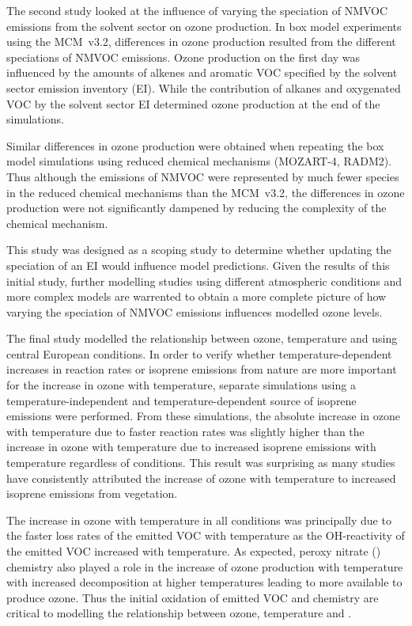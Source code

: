 The second study looked at the influence of varying the speciation of NMVOC emissions from the solvent sector on ozone production.
In box model experiments using the MCM~v3.2, differences in ozone production resulted from the different speciations of NMVOC emissions.
Ozone production on the first day was influenced by the amounts of alkenes and aromatic VOC specified by the solvent sector emission inventory (EI).
While the contribution of alkanes and oxygenated VOC by the solvent sector EI determined ozone production at the end of the simulations.

Similar differences in ozone production were obtained when repeating the box model simulations using reduced chemical mechanisms (MOZART-4, RADM2).
Thus although the emissions of NMVOC were represented by much fewer species in the reduced chemical mechanisms than the MCM~v3.2, the differences in ozone production were not significantly dampened by reducing the complexity of the chemical mechanism.

This study was designed as a scoping study to determine whether updating the speciation of an EI would influence model predictions.
Given the results of this initial study, further modelling studies using different atmospheric conditions and more complex models are warrented to obtain a more complete picture of how varying the speciation of NMVOC emissions influences modelled ozone levels.

The final study modelled the relationship between ozone, temperature and  using central European conditions.
In order to verify whether temperature-dependent increases in reaction rates or isoprene emissions from nature are more important for the increase in ozone with temperature, separate simulations using a temperature-independent and temperature-dependent source of isoprene emissions were performed.
From these simulations, the absolute increase in ozone with temperature due to faster reaction rates was slightly higher than the increase in ozone with temperature due to increased isoprene emissions with temperature regardless of  conditions.
This result was surprising as many studies \citep{Doherty:2013}  have consistently attributed the increase of ozone with temperature to increased isoprene emissions from vegetation.

The increase in ozone with temperature in all  conditions was principally due to the faster loss rates of the emitted VOC with temperature as the OH-reactivity of the emitted VOC increased with temperature.
As expected, peroxy nitrate () chemistry also played a role in the increase of ozone production with temperature with increased  decomposition at higher temperatures leading to more  available to produce ozone.
Thus the initial oxidation of emitted VOC and  chemistry are critical to modelling the relationship between ozone, temperature and .

